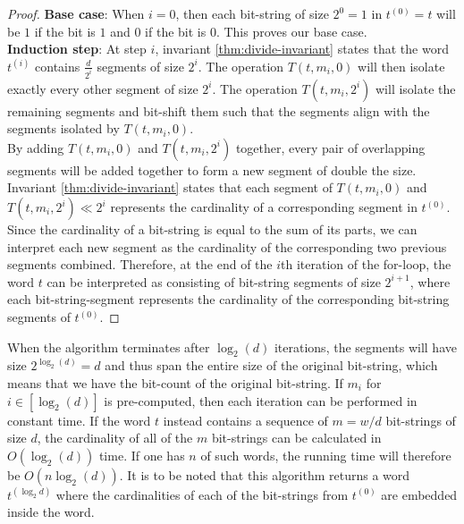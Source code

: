\begin{proof}
    \textbf{Base case}: When $i=0$, then each bit-string of size $2^0=1$ in $t^{(0)} = t$ will be $1$ if the bit is $1$ and $0$ if the bit is $0$. This proves our base case. \\
    \textbf{Induction step}:
    At step $i$, invariant \ref{thm:divide-invariant} states that the word $t^{(i)}$ contains $\frac{d}{2^i}$ segments of size $2^i$. The operation $T(t, m_i, 0)$ will then isolate exactly every other segment of size $2^i$. The operation $T(t, m_i, 2^i)$ will isolate the remaining segments and bit-shift them such that the segments align with the segments isolated by $T(t, m_i, 0)$.\\
    By adding $T(t, m_i, 0)$ and $T(t, m_i, 2^i)$ together, every pair of overlapping segments will be added together to form a new segment of double the size. Invariant \ref{thm:divide-invariant} states that each segment of $T(t, m_i, 0)$ and $T(t, m_i, 2^i) \ll 2^i$ represents the cardinality of a corresponding segment in $t^{(0)}$. Since the cardinality of a bit-string is equal to the sum of its parts, we can interpret each new segment as the cardinality of the corresponding two previous segments combined. Therefore, at the end of the $i$th iteration of the for-loop, the word $t$ can be interpreted as consisting of bit-string segments of size $2^{i+1}$, where each bit-string-segment represents the cardinality of the corresponding bit-string segments of $t^{(0)}$.
\end{proof}
When the algorithm terminates after $\log_2(d)$ iterations, the segments will have size $2^{\log_2{(d)}} = d$ and thus span the entire size of the original bit-string, which means that we have the bit-count of the original bit-string. If $m_{i}$ for $i\in [\log_2{(d)}]$ is pre-computed, then each iteration can be performed in constant time.
If the word $t$ instead contains a sequence of $m=w/d$ bit-strings of size $d$, the cardinality of all of the $m$ bit-strings can be calculated in $O(\log_2{(d)})$ time.
If one has $n$ of such words, the running time will therefore be $O(n\log_2{(d)})$.
It is to be noted that this algorithm returns a word $t^{(\log_2{d})}$ where the cardinalities of each of the bit-strings from $t^{(0)}$ are embedded inside the word.
